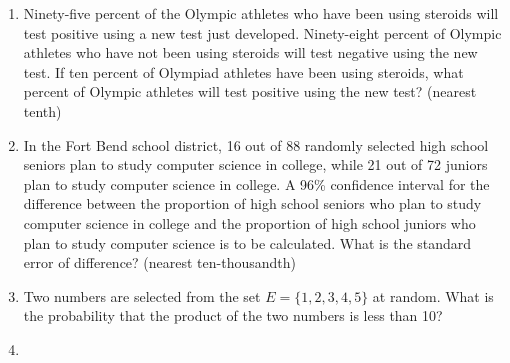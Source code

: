 \documentclass[../uilmath.tex]{subfiles}
\begin{document}
\begin{enumerate}[label=\bfseries\arabic*.]
    \item %
    Ninety-five percent of the Olympic athletes who have been using steroids will test positive using a new test just developed. Ninety-eight percent of Olympic athletes who have not been using steroids will test negative 
    using the new test. If ten percent of Olympiad athletes have been using steroids, what percent of Olympic athletes will test positive using the new test? (nearest tenth)

    \item %
    In the Fort Bend school district, 16 out of 88 randomly selected high school seniors plan to study computer science in college, while 21 out of 72 juniors plan to study computer science in college.
    A 96\% confidence interval for the difference between the proportion of high school seniors who plan to study computer science in college and the proportion of high school juniors who plan to study computer science is to be calculated.
    What is the standard error of difference? (nearest ten-thousandth)

    \item %
    Two numbers are selected from the set $E=\{1,2,3,4,5\}$ at random. What is the probability that the product of the two numbers is less than 10?

    \item %
    
\end{enumerate}
\end{document}
